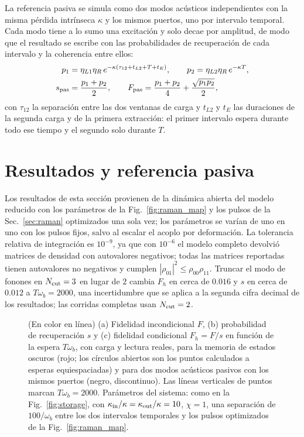 \documentclass[aps,pra,twocolumn,groupedaddress,amsmath,amssymb,floatfix]{revtex4-2}
\begin{document}
La referencia pasiva se simula como dos modos ac\'usticos independientes con la misma p\'erdida intr\'inseca $\kappa$ y los mismos puertos, uno por intervalo temporal. Cada modo tiene a lo sumo una excitaci\'on y solo decae por amplitud, de modo que el resultado se escribe con las probabilidades de recuperaci\'on de cada intervalo y la coherencia entre ellos:
\begin{align}
p_1&=\eta_{L1}\eta_R\,e^{-\kappa(\tau_{12}+t_{L2}+T+t_E)},\qquad
p_2=\eta_{L2}\eta_R\,e^{-\kappa T},\nonumber\\
s_{\rm pas}&=\frac{p_1+p_2}{2},\qquad
F_{\rm pas}=\frac{p_1+p_2}{4}+\frac{\sqrt{p_1p_2}}{2},\label{eq:passive}
\end{align}
con $\tau_{12}$ la separaci\'on entre las dos ventanas de carga y $t_{L2}$ y $t_E$ las duraciones de la segunda carga y de la primera extracci\'on: el primer intervalo espera durante todo ese tiempo y el segundo solo durante $T$.

\section{Resultados y referencia pasiva}
\label{sec:results}

Los resultados de esta secci\'on provienen de la din\'amica abierta del modelo reducido con los par\'ametros de la Fig.~\ref{fig:raman_map} y los pulsos de la Sec.~\ref{sec:raman} optimizados una sola vez; los par\'ametros se var\'ian de uno en uno con los pulsos fijos, salvo al escalar el acoplo por deformaci\'on. La tolerancia relativa de integraci\'on es $10^{-9}$, ya que con $10^{-6}$ el modelo completo devolvi\'o matrices de densidad con autovalores negativos; todas las matrices reportadas tienen autovalores no negativos y cumplen $|\rho_{01}|^2\le\rho_{00}\rho_{11}$. Truncar el modo de fonones en $N_{\rm cut}=3$ en lugar de $2$ cambia $F_h$ en cerca de $0.016$ y $s$ en cerca de $0.012$ a $T\omega_b=2000$, una incertidumbre que se aplica a la segunda cifra decimal de los resultados; las corridas completas usan $N_{\rm cut}=2$.

\begin{figure}[h]
	\centering
	\resizebox{\columnwidth}{!}{}
	\caption{(En color en l\'inea) (a) Fidelidad incondicional $F$, (b) probabilidad de recuperaci\'on $s$ y (c) fidelidad condicional $F_h=F/s$ en funci\'on de la espera $T\omega_b$, con carga y lectura reales, para la memoria de estados oscuros (rojo; los c\'irculos abiertos son los puntos calculados a esperas equiespaciadas) y para dos modos ac\'usticos pasivos con los mismos puertos (negro, discontinuo). Las l\'ineas verticales de puntos marcan $T\omega_b=2000$. Par\'ametros del sistema: como en la Fig.~\ref{fig:storage}, con $\kappa_{\rm in}/\kappa=\kappa_{\rm out}/\kappa=10$, $\chi=1$, una separaci\'on de $100/\omega_b$ entre los dos intervalos temporales y los pulsos optimizados de la Fig.~\ref{fig:raman_map}.}
	\label{fig:sweep}
\end{figure}
\end{document}

